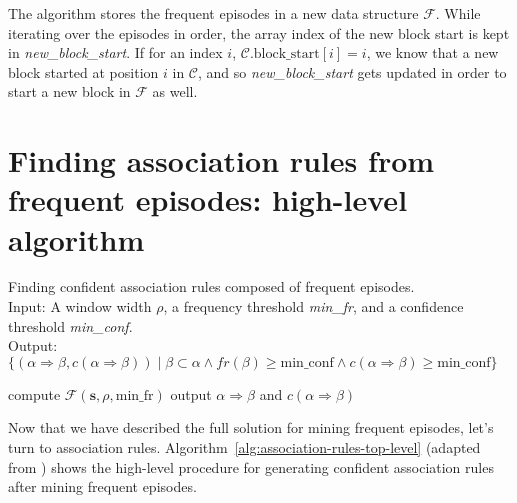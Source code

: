 The algorithm stores the frequent episodes in a new data structure $ \mathcal{F} $. While iterating over the episodes in order, the array index of the new block start is kept in \emph{new\_block\_start}. If for an index $ i $, $ \mathcal{C}. \text{block\_start}[i] = i $, we know that a new block started at position $ i $ in $ \mathcal{C} $, and so \emph{new\_block\_start} gets updated in order to start a new block in $ \mathcal{F} $ as well.



\section{Finding association rules from frequent episodes: high-level algorithm}

\begin{algorithm}

\caption{Finding confident association rules composed of frequent episodes.\\
Input: A window width $ \rho $, a frequency threshold \emph{min\_fr}, and a confidence threshold \emph{min\_conf}.\\
Output: $ \{ (\alpha \Rightarrow \beta, c(\alpha \Rightarrow \beta)) \mid \beta \subset \alpha \wedge fr(\beta) \geq \text{min\_conf} \wedge c(\alpha \Rightarrow \beta) \geq \text{min\_conf} \} $
}

\begin{algorithmic}[1]

\State compute $ \mathcal{F}(\boldsymbol{s}, \rho, \text{min\_fr}) $
    \ForAll{$ \alpha \subset \beta $} 
         \label{alglin:association-rules-top-level:compute-confidence}
            output $ \alpha \Rightarrow \beta $ and $ c(\alpha \Rightarrow \beta) $
        \EndIf
    \EndFor
\EndFor

\end{algorithmic}

\label{alg:association-rules-top-level}
\end{algorithm}

Now that we have described the full solution for mining frequent episodes, let's turn to association rules. Algorithm~\ref{alg:association-rules-top-level} (adapted from \citep{mannila1997discovery}) shows the high-level procedure for generating confident association rules after mining frequent episodes.

